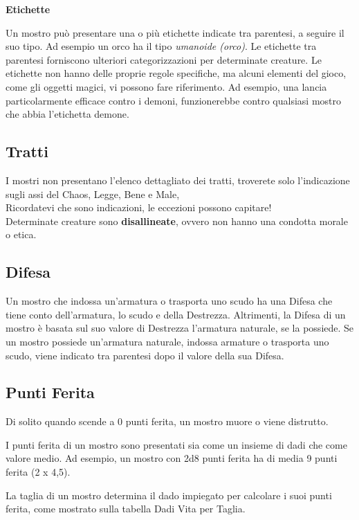 \begin{multicols}{2}
\medskip\textbf{Etichette}

Un mostro può presentare una o più etichette indicate tra parentesi, a seguire il suo tipo. Ad esempio un orco ha il tipo \emph{umanoide (orco)}. Le etichette tra parentesi forniscono ulteriori categorizzazioni per determinate creature. Le etichette non hanno delle proprie regole specifiche, ma alcuni elementi del gioco, come gli oggetti magici, vi possono fare riferimento. Ad esempio, una lancia particolarmente efficace contro i demoni, funzionerebbe contro qualsiasi mostro che abbia l'etichetta demone.

\subsection{Tratti}

I mostri non presentano l'elenco dettagliato dei tratti, troverete solo l'indicazione sugli assi del Chaos, Legge, Bene e Male,\\
Ricordatevi che sono indicazioni, le eccezioni possono capitare!\\

Determinate creature sono \textbf{disallineate}, ovvero non hanno una condotta morale o etica.

\subsection{Difesa}

Un mostro che indossa un'armatura o trasporta uno scudo ha una Difesa che tiene conto dell'armatura, lo scudo e della Destrezza. Altrimenti, la Difesa di un mostro è basata sul suo valore di Destrezza l'armatura naturale, se la possiede. Se un mostro possiede un'armatura naturale, indossa armature o trasporta uno scudo, viene indicato tra parentesi dopo il valore della sua Difesa.

\subsection{Punti Ferita}

Di solito quando scende a 0 punti ferita, un mostro muore o viene distrutto.

I punti ferita di un mostro sono presentati sia come un insieme di dadi che come valore medio. Ad esempio, un mostro con 2d8 punti ferita ha di media 9 punti ferita (2 x 4,5).

La taglia di un mostro determina il dado impiegato per calcolare i suoi punti ferita, come mostrato sulla tabella Dadi Vita per Taglia.


\end{multicols}
